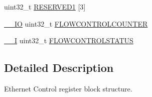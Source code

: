 \begin{DoxyCompactItemize}
\item 
uint32\-\_\-t \hyperlink{structENET__CONTROL__T_a83f993318d9638ea36fa88d8f5bcb957}{R\-E\-S\-E\-R\-V\-E\-D1} \mbox{[}3\mbox{]}
\item 
\hyperlink{core__cm3_8h_aec43007d9998a0a0e01faede4133d6be}{\-\_\-\-\_\-\-I\-O} uint32\-\_\-t \hyperlink{structENET__CONTROL__T_a988aac51d07bd4d330945f74f3747084}{F\-L\-O\-W\-C\-O\-N\-T\-R\-O\-L\-C\-O\-U\-N\-T\-E\-R}
\item 
\hyperlink{core__cm3_8h_af63697ed9952cc71e1225efe205f6cd3}{\-\_\-\-\_\-\-I} uint32\-\_\-t \hyperlink{structENET__CONTROL__T_abe816b0eaea3b8dcb126cbe565d81ffb}{F\-L\-O\-W\-C\-O\-N\-T\-R\-O\-L\-S\-T\-A\-T\-U\-S}
\end{DoxyCompactItemize}


\subsection{Detailed Description}
Ethernet Control register block structure. 

